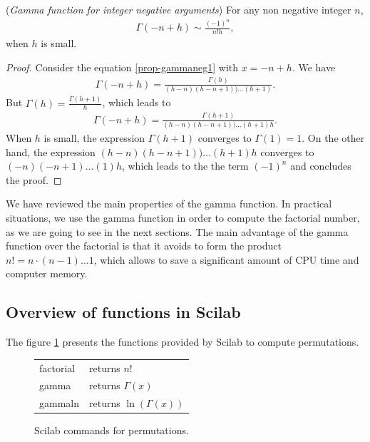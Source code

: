 \begin{proposition}
(\emph{Gamma function for integer negative arguments})
\label{prop-gammanegint}
For any non negative integer $n$, 
\begin{eqnarray}
\Gamma(-n+h) \sim \frac{(-1)^n}{n!h},
\end{eqnarray}
when $h$ is small.
\end{proposition}

\begin{proof}
Consider the equation \ref{prop-gammaneg1} with $x = -n+h$.
We have 
\begin{eqnarray}
\Gamma(-n+h) = \frac{\Gamma(h)}{(h-n)(h-n+1))\ldots(h+1)}.
\end{eqnarray}
But $\Gamma(h) = \frac{\Gamma(h+1)}{h}$, which leads to 
\begin{eqnarray}
\Gamma(-n+h) = \frac{\Gamma(h+1)}{(h-n)(h-n+1))\ldots(h+1)h}.
\end{eqnarray}
When $h$ is small, the expression $\Gamma(h+1)$ converges to $\Gamma(1) = 1$.
On the other hand, the expression $(h-n)(h-n+1))\ldots(h+1)h$ converges 
to $(-n)(-n+1)\ldots (1) h$, which leads to the the term $(-1)^n$
and concludes the proof.
\end{proof}

We have reviewed the main properties of the gamma function. In practical 
situations, we use the gamma function in order to compute the factorial 
number, as we are going to see in the next sections. 
The main advantage of the gamma function over the factorial is that it 
avoids to form the product $n!=n \cdot (n-1) \ldots 1$, which allows to 
save a significant amount of CPU time and computer memory.



\subsection{Overview of functions in Scilab}
The figure \ref{fig-introstats-funpermutations} presents the 
functions provided by Scilab to compute permutations.

\begin{figure}
\begin{center}
\begin{tabular}{|ll|}
\hline
factorial & returns $n!$\\
gamma & returns $\Gamma(x)$\\
gammaln & returns $\ln(\Gamma(x))$\\
\hline
\end{tabular}
\end{center}
\caption{Scilab commands for permutations.}
\label{fig-introstats-funpermutations}
\end{figure}

